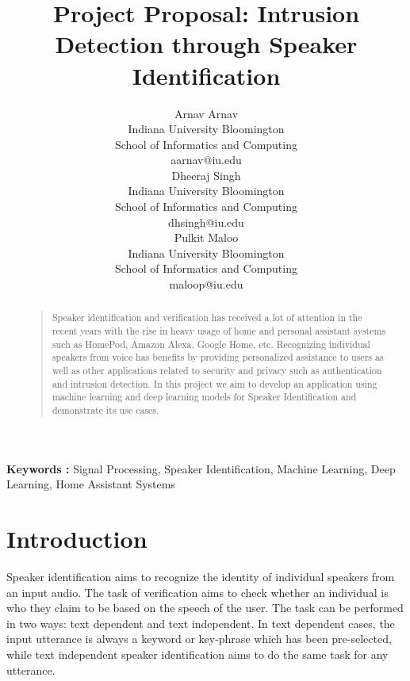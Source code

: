 \documentclass[letterpaper]{article}
\begin{document}
%
\title{Project Proposal: Intrusion Detection through Speaker Identification}
\author{%
    Arnav Arnav\\
    Indiana University Bloomington \\
    School of Informatics and Computing \\
    aarnav@iu.edu \\
    \And
    Dheeraj Singh\\
    Indiana University Bloomington \\
    School of Informatics and Computing \\
    dhsingh@iu.edu \\
    \And
    Pulkit Maloo\\
    Indiana University Bloomington \\
    School of Informatics and Computing \\
    maloop@iu.edu \\
}
\maketitle
\begin{abstract}
\begin{quote}
Speaker identification and verification has received a lot of attention in the recent years with the rise in heavy usage of home and personal assistant systems such as HomePod, Amazon Alexa, Google Home, etc. Recognizing individual speakers from voice has benefits by providing personalized assistance to users as well as other applications related to security and privacy such as authentication and intrusion detection. In this project we aim to develop an application using machine learning and deep learning models for Speaker Identification and demonstrate its use cases.

\end{quote}
\end{abstract}

\textbf{Keywords :} Signal Processing, Speaker Identification, Machine Learning, Deep Learning, Home Assistant Systems


\section{Introduction}
Speaker identification aims to recognize the identity of individual speakers from an input audio. The task of verification aims to check whether an individual is who they claim to be based on the speech of the user. The task can be performed in two ways: text dependent and text independent.  In text dependent cases, the input utterance is always a keyword or key-phrase which has been pre-selected, while text independent speaker identification aims to do the same task for any utterance. \cite{cassidy-speech}
 
\end{document}
